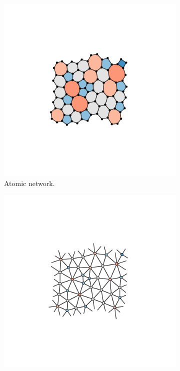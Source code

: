 \begin{figure}[h]
     \centering
     
     \begin{subfigure}[b]{0.3\textwidth}
         \centering
         \includegraphics[width=\textwidth]{./figures/methods/graph.pdf}
         \caption{Atomic network.}
         \label{fig:graphdualgraph}
     \end{subfigure}
     \hfill
	\begin{subfigure}[b]{0.3\textwidth}
         \centering
         \includegraphics[width=\textwidth]{./figures/methods/dual.pdf}

\end{subfigure}
\end{figure}
